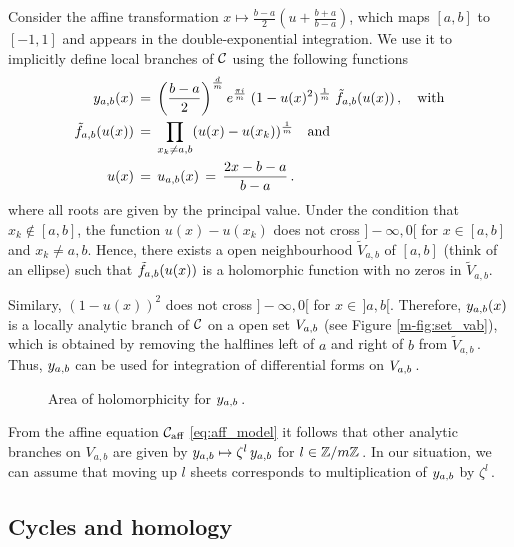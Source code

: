 \documentclass[main.tex]{subfiles}
\begin{document}
  
  Consider the affine transformation $x \mapsto \frac{b-a}{2}\left(u+\frac{b+a}{b-a}\right)$, which maps 
  $[a,b]$ to $[-1,1]$ and appears in the double-exponential integration. \abstand
  We use it to implicitly  define local branches of $\mathcal{C}$ using the following functions
  \begin{align}\label{def:yab}
  \begin{split}
   y_{a,b}(x) \, & = \, \left(\frac{b-a}{2}\right)^{\frac{d}{m}} e^{\frac{\pi i}{m}} \; (1 - u(x)^2)^{\frac{1}{m}} \; \tilde{f}_{a,b}(u(x))\,, \quad \text{with} \\
   \tilde{f}_{a,b}(u(x)) \, & = \, \prod_{x_k \ne a,b} (u(x) - u(x_k))^{\frac{1}{m}} \quad \text{and} \\
   u(x) \,& = \, u_{a,b}(x) \,=\, \frac{2x-b-a}{b-a}\,.
   \end{split}
  \end{align}
  where all roots are given by the principal value. Under the condition that $x_k \not\in [a,b]$, the function $u(x)-u(x_k)$ does not cross $]\!\!-\infty,0[$
  for $x \in [a,b]$ and $x_k \ne a,b$. Hence, there exists a open neighbourhood $\tilde{V}_{a,b}$ of $[a,b]$ (think of an ellipse) such that
  $\tilde{f}_{a,b}(u(x))$ is a holomorphic function with no zeros in $\tilde{V}_{a,b}$.
  
  \medskip
  
  Similary, $(1-u(x))^2$ does not cross $]\!\!-\infty,0[$ for $x \in \,]a,b[$. Therefore, 
 $y_{a,b}(x)$ is a locally analytic branch of $\mathcal{C}$ on a open set $V_{a,b}$ (see Figure \ref{m-fig:set_vab}), which is obtained by removing the halflines left of $a$ and right of 
 $b$ from $\tilde{V}_{a,b}$\,. \abstand
 Thus, $y_{a,b}$ can be used for integration of differential forms on $V_{a,b}$\,.
 \begin{figure}[H]
      \begin{center}
	  
      \end{center}
    \caption{Area of holomorphicity for $y_{a,b}$\,.}
    \label{fig:set_vab}
\end{figure}
 
 From the affine equation $\mathcal{C}_{\text{aff}}$ \eqref{eq:aff_model} it follows that other analytic branches on $V_{a,b}$ are given by
      $y_{a,b} \mapsto \zeta^l \,y_{a,b}$ for $l \in \mathbb{Z}/m\mathbb{Z}$\,.
  In our situation, we can assume that moving up $l$ sheets corresponds to multiplication of $y_{a,b}$ by $\zeta^l$\,. 

  \bigskip
  
  
  \subsection{Cycles and homology}\label{subsec:cycles_homo}
    
\end{document}
